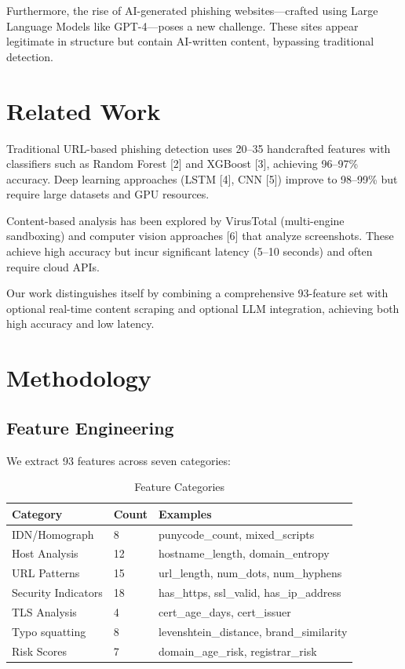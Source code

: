 \documentclass[10pt, conference]{IEEEtran}
\begin{document}
Furthermore, the rise of AI-generated phishing websites—crafted using Large Language Models like GPT-4—poses a new challenge. These sites appear legitimate in structure but contain AI-written content, bypassing traditional detection.

\section{Related Work}
Traditional URL-based phishing detection uses 20--35 handcrafted features with classifiers such as Random Forest [2] and XGBoost [3], achieving 96--97\% accuracy. Deep learning approaches (LSTM [4], CNN [5]) improve to 98--99\% but require large datasets and GPU resources.

Content-based analysis has been explored by VirusTotal (multi-engine sandboxing) and computer vision approaches [6] that analyze screenshots. These achieve high accuracy but incur significant latency (5--10 seconds) and often require cloud APIs.

Our work distinguishes itself by combining a comprehensive 93-feature set with optional real-time content scraping and optional LLM integration, achieving both high accuracy and low latency.

\section{Methodology}

\subsection{Feature Engineering}
We extract 93 features across seven categories:

\begin{table}[h]
    \centering
    \caption{Feature Categories}
    \label{tab:features}
    \begin{tabular}{@{}lll@{}}
        \toprule
        Category & Count & Examples \\
        \midrule
        IDN/Homograph & 8 & punycode\_count, mixed\_scripts \\
        Host Analysis & 12 & hostname\_length, domain\_entropy \\
        URL Patterns & 15 & url\_length, num\_dots, num\_hyphens \\
        Security Indicators & 18 & has\_https, ssl\_valid, has\_ip\_address \\
        TLS Analysis & 4 & cert\_age\_days, cert\_issuer \\
        Typo squatting & 8 & levenshtein\_distance, brand\_similarity \\
        Risk Scores & 7 & domain\_age\_risk, registrar\_risk \\
        \bottomrule
    \end{tabular}
\end{table}
\end{document}
